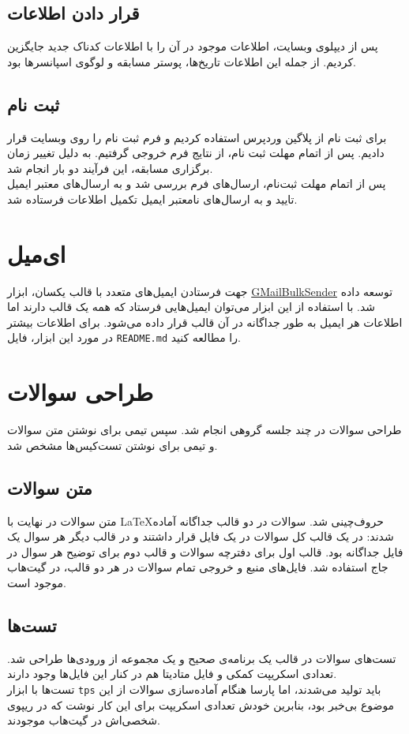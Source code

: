 \documentclass{report}
\begin{document}
\subsection{قرار دادن اطلاعات}
پس از دیپلوی وبسایت، اطلاعات موجود در آن را با اطلاعات کدناک جدید جایگزین کردیم. از جمله این اطلاعات تاریخ‌ها، پوستر مسابقه و لوگوی اسپانسرها بود.

\subsection{ثبت نام}
برای ثبت نام از پلاگین  وردپرس استفاده کردیم و فرم ثبت نام را روی وبسایت قرار دادیم. پس از اتمام مهلت ثبت نام، از نتایج فرم خروجی  گرفتیم. به دلیل تغییر زمان برگزاری مسابقه، این فرآیند دو بار انجام شد. \\
پس از اتمام مهلت ثبت‌نام، ارسال‌های فرم بررسی شد و به ارسال‌های معتبر ایمیل تایید و به ارسال‌های نامعتبر ایمیل تکمیل اطلاعات فرستاده شد. \\


\section{ای‌میل}
جهت فرستادن ایمیل‌های متعدد با قالب یکسان، ابزار \href{https://github.com/CodeKnock1401/GMailBulkSender}{GMailBulkSender} توسعه داده شد. با استفاده از این ابزار می‌توان ایمیل‌هایی فرستاد که همه یک قالب دارند اما اطلاعات هر ایمیل به طور جداگانه در آن قالب قرار داده می‌شود. برای اطلاعات بیشتر در مورد این ابزار، فایل \verb|README.md| را مطالعه کنید.

\section{طراحی سوالات}
طراحی سوالات در چند جلسه گروهی انجام شد. سپس تیمی برای نوشتن متن سوالات و تیمی برای نوشتن تست‌کیس‌ها مشخص شد.
\subsection{متن سوالات}
متن سوالات در نهایت با \LaTeX حروف‌چینی شد. سوالات در دو قالب جداگانه آماده شدند: در یک قالب کل سوالات در یک فایل قرار داشتند و در قالب دیگر هر سوال یک فایل جداگانه بود. قالب اول برای دفترچه سوالات و قالب دوم برای توضیح هر سوال در جاج استفاده شد. فایل‌های منبع و خروجی تمام سوالات در هر دو قالب، در گیت‌هاب موجود است.
\subsection{تست‌ها}
تست‌های سوالات در قالب یک برنامه‌ی صحیح و یک مجموعه از ورودی‌ها طراحی شد. تعدادی اسکریپت کمکی و فایل متادیتا هم در کنار این فایل‌ها وجود دارند. \\
تست‌ها با ابزار \verb|tps| باید تولید می‌شدند، اما پارسا هنگام آماده‌سازی سوالات از این موضوع بی‌خبر بود، بنابرین خودش تعدادی اسکریپت برای این کار نوشت که در ریپوی شخصی‌اش در گیت‌هاب موجودند. 
\end{document}
